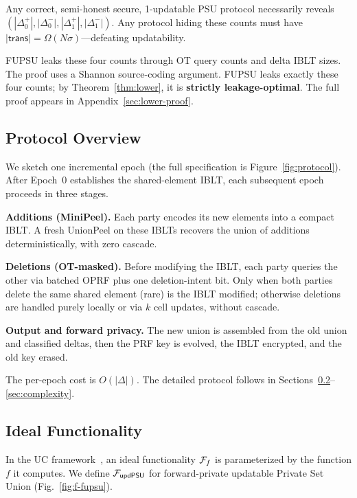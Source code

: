 \begin{theorem}\label{thm:lower}
Any correct, semi-honest secure, 1-updatable PSU protocol necessarily reveals
$(|\Delta^+_0|, |\Delta^-_0|, |\Delta^+_1|, |\Delta^-_1|)$. Any protocol
hiding these counts must have $|\mathsf{trans}| = \Omega(N\sigma)$---defeating
updatability.
\end{theorem}

FUPSU leaks these four counts through OT query counts and delta IBLT sizes.
The proof uses a Shannon source-coding argument. FUPSU leaks exactly these
four counts; by Theorem~\ref{thm:lower}, it is \textbf{strictly
leakage-optimal}. The full proof appears in Appendix~\ref{sec:lower-proof}.

\subsection{Protocol Overview}

We sketch one incremental epoch (the full specification is
Figure~\ref{fig:protocol}). After Epoch~0 establishes the shared-element
IBLT, each subsequent epoch proceeds in three stages.

\smallskip\noindent\textbf{Additions (MiniPeel).} Each party encodes its
new elements into a compact IBLT. A fresh UnionPeel on these IBLTs
recovers the union of additions deterministically, with zero cascade.

\smallskip\noindent\textbf{Deletions (OT-masked).} Before modifying the
IBLT, each party queries the other via batched OPRF plus one deletion-intent
bit. Only when both parties delete the same shared element (rare) is the
IBLT modified; otherwise deletions are handled purely locally or via $k$
cell updates, without cascade.

\smallskip\noindent\textbf{Output and forward privacy.} The new union is
assembled from the old union and classified deltas, then the PRF key is
evolved, the IBLT encrypted, and the old key erased.

The per-epoch cost is $O(|\Delta|)$. The detailed protocol follows in
Sections~\ref{sec:ideal}--\ref{sec:complexity}.

\subsection{Ideal Functionality}\label{sec:ideal}

	In the UC framework~\cite{Can01}, an ideal functionality $\mathcal{F}_{f}$ is
	parameterized by the function $f$ it computes. We define
	$\mathcal{F}_{\mathsf{updPSU}}$ for forward-private updatable Private Set Union
	(Fig.~\ref{fig:f-fupsu}).

